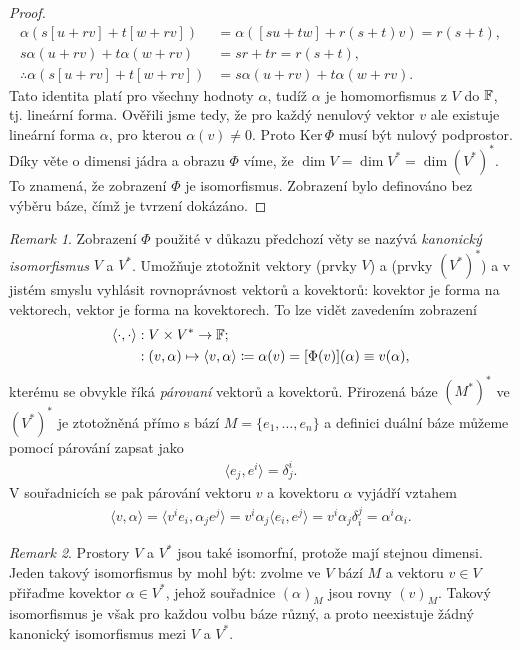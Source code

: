 \documentclass[a4paper,11pt]{article}
\theoremstyle{theorem}
\theoremstyle{remark}
\newtheorem*{remark}{Remark}
\theoremstyle{definition}
\newcommand{\Ker}{{\mathrm{Ker}\,}}
\begin{document}
\begin{proof}
		\begin{align*}
			\alpha(s[u+rv] + t[w+rv]) &= \alpha([su + tw] + r(s+t)v) = r(s+t),
			\\
			s\alpha(u+rv) + t\alpha(w+rv) &= sr+tr = r(s+t),
			\\
			\therefore \alpha(s[u+rv] + t[w+rv]) &= s\alpha(u+rv) + t\alpha(w+rv).
		\end{align*}
		Tato identita platí pro všechny hodnoty $\alpha$, tudíž $\alpha$ je homomorfismus z $V$ do ${\mathbb F}$, tj. lineární forma. Ověřili jsme tedy, že pro každý nenulový vektor $v$ ale existuje lineární forma $\alpha$, pro kterou $\alpha(v) \not= 0$. Proto $\Ker \Phi$ musí být nulový podprostor.
		\\
		Díky věte o dimensi jádra a obrazu $\Phi$ víme, že $\dim V = \dim V^* = \dim (V^*)^*$. To znamená, že zobrazení $\Phi$ je isomorfismus. Zobrazení bylo definováno bez výběru báze, čímž je tvrzení dokázáno.
	\end{proof}
	
	\begin{remark}
		Zobrazení $\Phi$ použité v důkazu předchozí věty se nazývá \textit{kanonický isomorfismus} $V$ a $V^*$. Umožňuje ztotožnit vektory (prvky $V$) a  (prvky $(V^*)^*$) a v jistém smyslu vyhlásit rovnoprávnost vektorů a kovektorů: kovektor je forma na vektorech, vektor je forma na kovektorech. To lze vidět zavedením zobrazení
		\begin{align*}
			\langle \cdot , \cdot \rangle &: V \times V^* \to {\mathbb F};
			\\
			&: (v,\alpha) \mapsto \langle v,\alpha \rangle \coloneqq \alpha(v) = [\Phi(v)](\alpha) \equiv v(\alpha),
		\end{align*}
		kterému se obvykle říká \textit{párovaní} vektorů a kovektorů. Přirozená báze $(M^*)^*$ ve $(V^*)^*$ je ztotožněná přímo s bází $M = \{e_1, \dots, e_n\}$ a definici duální báze můžeme pomocí párování zapsat jako
		\begin{align*}
			\langle e_j, e^i \rangle = \delta^i_j.
		\end{align*}
		V souřadnicích se pak párování vektoru $v$ a kovektoru $\alpha$ vyjádří vztahem
		\begin{align*}
			\langle v,\alpha \rangle = \langle v^i e_i, \alpha_j e^j \rangle = v^i \alpha_j \langle e_i, e^j \rangle = v^i \alpha_j \delta^j_i = \alpha^i \alpha_i.
		\end{align*}
	\end{remark}
	
	\begin{remark}
		Prostory $V$ a $V^*$ jsou také isomorfní, protože mají stejnou dimensi. Jeden takový isomorfismus by mohl být: zvolme ve $V$ bází $M$ a vektoru $v \in V$ přiřaďme kovektor $\alpha \in V^*$, jehož souřadnice $(\alpha)_M$ jsou rovny $(v)_M$. Takový isomorfismus je však pro každou volbu báze různý, a proto neexistuje žádný kanonický isomorfismus mezi $V$ a $V^*$.
	\end{remark}
	
\end{document}

